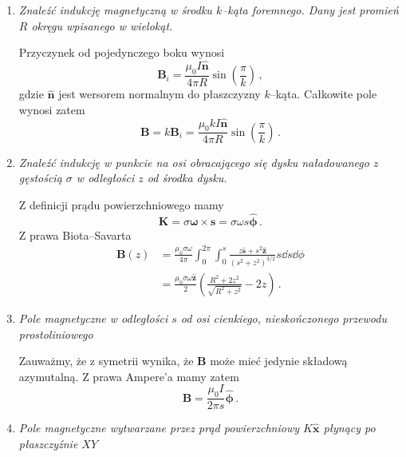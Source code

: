 \documentclass[../main.tex]{subfiles}
\begin{document}
\begin{enumerate}
    \item\textit{Znaleźć indukcję magnetyczną w środku \(k\)--kąta foremnego. Dany jest promień
    \(R\) okręgu wpisanego w wielokąt.}
    \medskip
    
    Przyczynek od pojedynczego boku wynosi
    \begin{equation*}
        \mathbf{B}_i=\frac{\mu_0I\mathbf{\hat{n}}}{4\pi R}\sin\left(\frac{\pi}{k}\right)\,,
    \end{equation*}
    gdzie \(\mathbf{\hat{n}}\) jest wersorem normalnym do płaszczyzny \(k\)--kąta. Całkowite pole
    wynosi zatem
    \begin{equation*}
        \mathbf{B}=k\mathbf{B}_i=\frac{\mu_0kI\mathbf{\hat{n}}}{4\pi R}\sin\left(\frac{\pi}{k}\right)\,.
    \end{equation*}
    
    \item\textit{Znaleźć indukcję w punkcie na osi obracającego się dysku naładowanego z gęstością
    \(\sigma\) w odległości \(z\) od środka dysku.}
    \medskip
    
    Z definicji prądu powierzchniowego mamy
    \begin{equation*}
        \mathbf{K}=\sigma\boldsymbol{\omega}\times\mathbf{s}=\sigma\omega s\boldsymbol{\hat{\phi}}\,.
    \end{equation*}
    Z prawa Biota--Savarta
    \begin{equation*}
    \begin{split}
        \mathbf{B}(z)&=\frac{\mu_0\sigma\omega}{4\pi}\int_0^{2\pi}\int_0^s\frac{z\mathbf{\hat{s}}+s^2\mathbf{\hat{z}}}{(s^2+z^2)^{3/2}}s \dd{s}\dd{\phi}\\
        &=\frac{\mu_0\sigma\omega\mathbf{\hat{z}}}{2}\left(\frac{R^2+2z^2}{\sqrt{R^2+z^2}}-2z\right)\,.
    \end{split}
    \end{equation*}
    \item \textit{Pole magnetyczne w odległości \(s\) od osi cienkiego, nieskończonego przewodu
    prostoliniowego}
    \medskip
    
    Zauważmy, że z symetrii wynika, że \(\mathbf{B}\) może mieć jedynie składową azymutalną. Z prawa
    Ampere'a mamy zatem
    \begin{equation*}
        \mathbf{B}=\frac{\mu_0I}{2\pi s}\boldsymbol{\hat{\phi}}\,.
    \end{equation*}
    
    \item\textit{Pole magnetyczne wytwarzane przez prąd powierzchniowy \(K\mathbf{\hat{x}}\) płynący
    po płaszczyźnie \(XY\)}
    \medskip
    

\end{enumerate}
\end{document}
